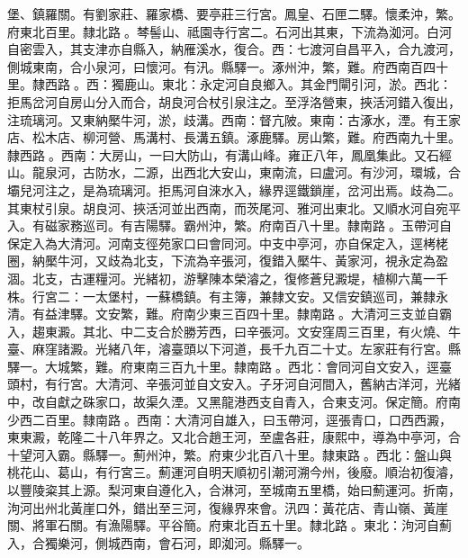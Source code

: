 \begin{pinyinscope}
堡、鎮羅關。有劉家莊、羅家橋、要亭莊三行宮。鳳皇、石匣二驛。懷柔沖，繁。府東北百里。隸北路。棽髻山、祗園寺行宮二。石河出其東，下流為洳河。白河自密雲入，其支津亦自縣入，納雁溪水，復合。西：七渡河自昌平入，合九渡河，側城東南，合小泉河，曰懷河。有汛。縣驛一。涿州沖，繁，難。府西南百四十里。隸西路。西：獨鹿山。東北：永定河自良鄉入。其金門閘引河，淤。西北：拒馬岔河自房山分入而合，胡良河合杖引泉注之。至浮洛營東，挾活河錯入復出，注琉璃河。又東納檿牛河，淤，歧溝。西南：督亢陂。東南：古涿水，湮。有王家店、松木店、柳河營、馬溝村、長溝五鎮。涿鹿驛。房山繁，難。府西南九十里。隸西路。西南：大房山，一曰大防山，有溝山峰。雍正八年，鳳凰集此。又石經山。龍泉河，古防水，二源，出西北大安山，東南流，曰盧河。有沙河，環城，合壩兒河注之，是為琉璃河。拒馬河自淶水入，緣界逕鐵鎖崖，岔河出焉。歧為二。其東杖引泉。胡良河、挾活河並出西南，而茨尾河、雅河出東北。又順水河自宛平入。有磁家務巡司。有吉陽驛。霸州沖，繁。府南百八十里。隸南路。玉帶河自保定入為大清河。河南支徑苑家口曰會同河。中支中亭河，亦自保定入，逕栲栳圈，納檿牛河，又歧為北支，下流為辛張河，復錯入檿牛、黃家河，視永定為盈涸。北支，古運糧河。光緒初，游擊陳本榮濬之，復修蒼兒澱堤，植柳六萬一千株。行宮二：一太堡村，一蘇橋鎮。有主簿，兼隸文安。又信安鎮巡司，兼隸永清。有益津驛。文安繁，難。府南少東三百四十里。隸南路。大清河三支並自霸入，趨東澱。其北、中二支合於勝芳西，曰辛張河。文安窪周三百里，有火燒、牛臺、麻窪諸澱。光緒八年，濬臺頭以下河道，長千九百二十丈。左家莊有行宮。縣驛一。大城繁，難。府東南三百九十里。隸南路。西北：會同河自文安入，逕臺頭村，有行宮。大清河、辛張河並自文安入。子牙河自河間入，舊納古洋河，光緒中，改自獻之硃家口，故渠久湮。又黑龍港西支自青入，合東支河。保定簡。府南少西二百里。隸南路。西南：大清河自雄入，曰玉帶河，逕張青口，口西西澱，東東澱，乾隆二十八年界之。又北合趙王河，至盧各莊，康熙中，導為中亭河，合十望河入霸。縣驛一。薊州沖，繁。府東少北百八十里。隸東路。西北：盤山與桃花山、葛山，有行宮三。薊運河自明天順初引潮河溯今州，後廢。順治初復濬，以豐陵粢其上源。梨河東自遵化入，合淋河，至城南五里橋，始曰薊運河。折南，泃河出州北黃崖口外，錯出至三河，復緣界來會。汛四：黃花店、青山嶺、黃崖關、將軍石關。有漁陽驛。平谷簡。府東北百五十里。隸北路。東北：泃河自薊入，合獨樂河，側城西南，會石河，即洳河。縣驛一。


\end{pinyinscope}
